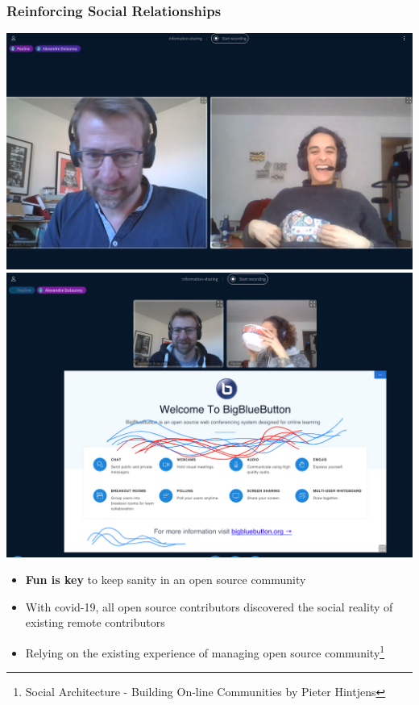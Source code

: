 \documentclass{beamer}
\begin{document}
\begin{frame}[fragile]
        \frametitle{Reinforcing Social Relationships}
        \begin{multicols}{2}
        \null \vfill
        \includegraphics[scale=0.08]{./images/soutif.png}
        \includegraphics[scale=0.08]{./images/miso.png}
        \vfill \null
        \columnbreak
        \null \vfill
        \begin{itemize}
                \item {\bf Fun is key} to keep sanity in an open source community
          \item With covid-19, all open source contributors discovered the social reality of existing remote contributors
          \item Relying on the existing experience of managing open source community\footnote{Social Architecture - Building On-line Communities by Pieter Hintjens}
        \end{itemize}
        \vfill \null
        \end{multicols}
\end{frame}
\end{document}
